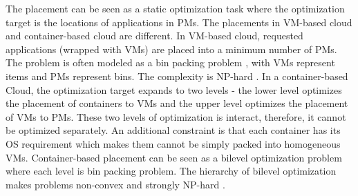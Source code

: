   The placement can be seen as a static optimization task where the optimization target is the locations of applications in PMs. 
The placements in VM-based cloud and container-based cloud are different. In VM-based cloud, requested applications (wrapped with VMs) are placed into a minimum number of PMs. The problem is often modeled as a bin packing problem \cite{Xiong:2014jq}, with VMs represent items and PMs represent bins. The complexity is NP-hard \cite{Hochbaum:1996ts}. In a container-based Cloud, the optimization target expands to two levels - the lower level optimizes the placement of containers to VMs and the upper level optimizes the placement of VMs to PMs. These two levels of optimization is interact, therefore, it cannot be optimized separately. An additional constraint is that each container has its OS requirement which makes them cannot be simply packed into homogeneous VMs. Container-based placement can be seen as a bilevel optimization problem \cite{Colson:2007bu} where each level is bin packing problem. The hierarchy of bilevel optimization makes problems non-convex and strongly NP-hard \cite{Vicente:1994ie}.





